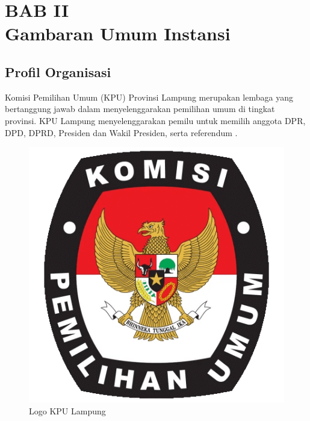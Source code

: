 
\section*{\centering BAB II \\ Gambaran Umum Instansi}


\setcounter{section}{2}
\setcounter{subsection}{0}  %
\setcounter{figure}{0}
\renewcommand{\thefigure}{\thesection.\arabic{figure}}

\subsection{Profil Organisasi}
Komisi Pemilihan Umum (KPU) Provinsi Lampung merupakan lembaga yang bertanggung jawab dalam menyelenggarakan pemilihan umum di tingkat provinsi. KPU Lampung menyelenggarakan pemilu untuk memilih anggota DPR, DPD, DPRD, Presiden dan Wakil Presiden, serta referendum \cite{KpuDefinition} .
\begin{figure}[h]
    \centering
    \includegraphics[width=0.5\linewidth]{images/kpu_logo.png}
    \caption{Logo KPU Lampung}
    \label{fig:kpu_logo}
\end{figure}

